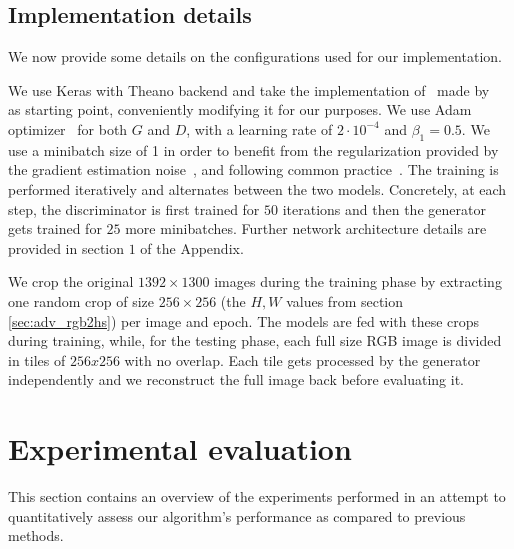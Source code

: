 \documentclass{bmvc2k}
\begin{document}
\subsection{Implementation details}
\label{sec:implementation}
We now provide some details on the configurations used for our implementation.

We use Keras with Theano backend and take the implementation of~\cite{pix2pix2016} made by~\cite{costa_towards_2017} as starting point, conveniently modifying it for our purposes.
We use Adam optimizer~\cite{kingma_adam:_2015} for both $G$ and $D$, with a learning rate of $2\cdot10^{-4}$ and $\beta_1=0.5$. We use a minibatch size of 1 in order to benefit from the regularization provided by the gradient estimation noise~\cite{keskar_large-batch_2017}, and following common practice~\cite{pix2pix2016}. The training is performed iteratively and alternates between the two models. Concretely, at each step, the discriminator is first trained for $50$ iterations and then the generator gets trained for $25$ more minibatches. 
Further network architecture details are provided in section $1$ of the Appendix. 

We crop the original $1392\times 1300$ images during the training phase by extracting one random crop of size $256\times 256$ (the $H,W$ values from section \ref{sec:adv_rgb2hs}) per image and epoch.
The models are fed with these crops during training, while, for the testing phase, each full size RGB image is divided in tiles of $256x256$ with no overlap.
Each tile gets processed by the generator independently and we reconstruct the full image back before evaluating it.

\section{Experimental evaluation}
\label{sec:experimental_evaluation}

This section contains an overview of the experiments performed in an attempt to quantitatively assess our algorithm's performance as compared to previous methods.

\end{document}
